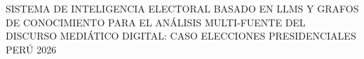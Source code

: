 \begin{center}
	\vspace*{10cm}
	{SISTEMA DE INTELIGENCIA ELECTORAL BASADO EN LLMS Y GRAFOS DE CONOCIMIENTO PARA EL ANÁLISIS MULTI-FUENTE DEL DISCURSO MEDIÁTICO DIGITAL: CASO ELECCIONES PRESIDENCIALES PERÚ 2026}
\end{center}
